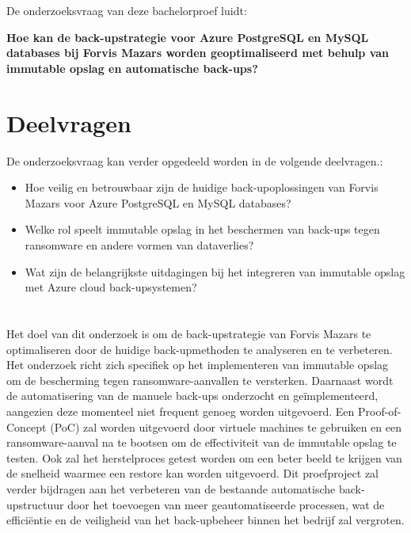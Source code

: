 \section{}%
\label{sec:onderzoeksvraag}

De onderzoeksvraag van deze bachelorproef luidt:

\textbf{Hoe kan de back-upstrategie voor Azure PostgreSQL en MySQL databases bij Forvis Mazars worden geoptimaliseerd met behulp van immutable opslag en automatische back-ups?}

\section{Deelvragen}
De onderzoeksvraag kan verder opgedeeld worden in de volgende deelvragen.:
\begin{itemize}
    \item Hoe veilig en betrouwbaar zijn de huidige back-upoplossingen van Forvis Mazars voor Azure PostgreSQL en MySQL databases?
    \item Welke rol speelt immutable opslag in het beschermen van back-ups tegen ransomware en andere vormen van dataverlies?
    \item Wat zijn de belangrijkste uitdagingen bij het integreren van immutable opslag met Azure cloud back-upsystemen?
\end{itemize}

\section{}%
\label{sec:onderzoeksdoelstelling}

Het doel van dit onderzoek is om de back-upstrategie van Forvis Mazars te optimaliseren door de huidige back-upmethoden te analyseren en te verbeteren. Het onderzoek richt zich specifiek op het implementeren van immutable opslag om de bescherming tegen ransomware-aanvallen te versterken. Daarnaast wordt de automatisering van de manuele back-ups onderzocht en geïmplementeerd, aangezien deze momenteel niet frequent genoeg worden uitgevoerd. Een Proof-of-Concept (PoC) zal worden uitgevoerd door virtuele machines te gebruiken en een ransomware-aanval na te bootsen om de effectiviteit van de immutable opslag te testen. Ook zal het herstelproces getest worden om een beter beeld te krijgen van de snelheid waarmee een restore kan worden uitgevoerd. Dit proefproject zal verder bijdragen aan het verbeteren van de bestaande automatische back-upstructuur door het toevoegen van meer geautomatiseerde processen, wat de efficiëntie en de veiligheid van het back-upbeheer binnen het bedrijf zal vergroten.
